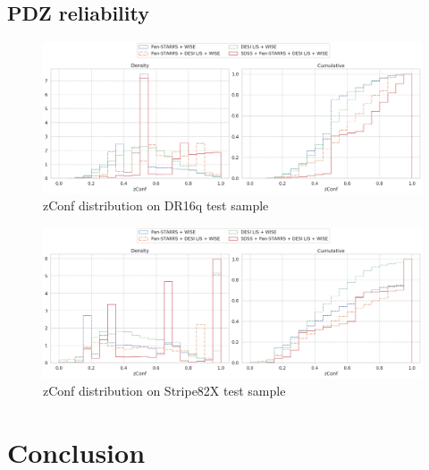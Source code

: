 \documentclass[fleqn,usenatbib]{mnras}
\begin{document}
\subsection{PDZ reliability}

\begin{figure}
    \centering
    \includegraphics[width=0.9\linewidth]{images/zconf-cal-dr16q.png}
    \caption{zConf distribution on DR16q test sample}
    \label{fig:zconf-cal-dr16q}
\end{figure}

\begin{figure}
    \centering
    \includegraphics[width=0.9\linewidth]{images/zconf-cal-stripe82X.png}
    \caption{zConf distribution on Stripe82X test sample}
    \label{fig:zconf-cal-stripe82X}
\end{figure}


\section{Conclusion}

\end{document}
